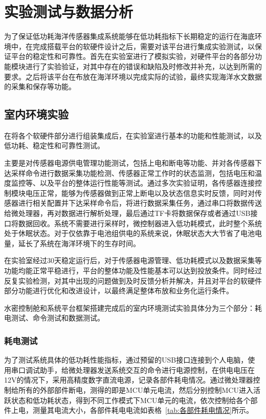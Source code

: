 \chapter{实验测试与数据分析}
\label{cha:chapter6}
为了保证低功耗海洋传感器集成系统能够在低功耗指标下长期稳定的运行在海底环境中，在完成搭载平台的软硬件设计之后，需要对该平台进行集成实验测试，以保证平台的稳定性和可靠性。首先在实验室进行了模拟实验，对硬件平台的各部分功能模块进行了实验验证，对其中存在的错误和缺陷及时修改并补充，以达到所需的要求。之后将该平台在布放在海洋环境以完成实际的试验，最终实现海洋水文数据的采集和保存等功能。

\section{室内环境实验}
在将各个软硬件部分进行组装集成后，在实验室进行基本的功能和性能测试，以及低功耗、稳定性和可靠性测试。

主要是对传感器电源供电管理功能测试，包括上电和断电等功能、并对各传感器下达采样命令进行数据采集功能检测、传感器正常工作时的状态监测，包括电压和温度监控等、以及平台的整体运行性能等测试。通过多次实验证明，各传感器连接控制模块电压正常，能够为传感器做到正常上断电以及状态信息实时反馈，同时对传感器进行相关配置并下达采样命令后，将进行数据采集任务，通过串口将数据传送给微处理器，再对数据进行解析处理，最后通过TF卡将数据保存或者通过USB接口将数据回收。系统不需要进行采样时，微控制器进入低功耗模式，此时整个系统处于休眠状态。对于仅依靠于电池组供电的系统来说，休眠状态大大节省了电池电量，延长了系统在海洋环境下的生存时间。

在实验室经过30天稳定运行后，对于传感器电源管理、低功耗模式以及数据采集等功能均能正常平稳进行，平台的整体功能及性能基本可以达到投放条件。同时经过反复实验检测，对其中出现的问题做到及时反馈分析并解决，并且对平台的软硬件部分功能进行优化和改进设计，以最终满足整体布放和业务化运行条件。

水密控制舱和系统平台框架搭建完成后的室内环境测试实验具体分为三个部分：耗电测试、命令测试和数据测试。
\subsection{耗电测试}
为了测试系统具体的低功耗性能指标，通过预留的USB接口连接到个人电脑，使用串口调试助手，给微处理器发送系统交互的命令进行电源控制，在供电电压在12V的情况下，采用高精度数字直流电源，记录各部件耗电情况。通过微处理器控制给所有的外部部件断电，测得的即是MCU单元电流，然后分别控制MCU进入活跃状态和低功耗状态，得到不同工作模式下MCU单元的电流，依次控制给各个部件上电，测量其电流大小，各部件耗电电流如表格~\ref{tab:各部件耗电情况}所示。

